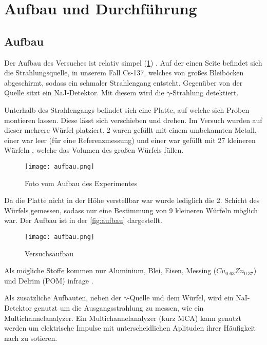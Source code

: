 \section{Aufbau und Durchführung}

\subsection{Aufbau}
Der Aufbau des Versuches ist relativ simpel (\ref{fig:1}) . Auf der einen Seite befindet sich die Strahlungsquelle, in unserem
Fall Cs-137, welches von großes Bleiböcken abgeschirmt, sodass ein schmaler Strahlengang entsteht. Gegenüber 
von der Quelle sitzt ein NaJ-Detektor. Mit diesem wird die $\gamma$-Strahlung detektiert. 

\noindent
Unterhalb des Strahlengangs befindet sich eine Platte, auf welche sich Proben montieren lassen. Diese lässt 
sich verschieben und drehen. Im Versuch wurden auf dieser mehrere Würfel platziert. 2 waren gefüllt mit einem
umbekannten Metall, einer war leer (für eine Referenzmessung) und einer war gefüllt mit 27 kleineren Würfeln
, welche das Volumen des großen Würfels füllen.

\begin{figure}[H]
	\centering
	\texttt{[image: aufbau.png]}
	\caption{Foto vom Aufbau des Experimentes \biber}
	\label{fig:1}
\end{figure}

\noindent
Da die Platte nicht in der Höhe verstellbar war wurde lediglich die 2. Schicht des Würfels gemessen, sodass nur eine Bestimmung von 9 kleineren Würfeln möglich war. Der Aufbau ist
in der \autoref{fig:aufbau} dargestellt.

\begin{figure}
    \centering
    \texttt{[image: aufbau.png]}
    \caption{Versuchsaufbau \cite{V14}}
    \label{fig:aufbau}
  \end{figure}

\noindent
Als mögliche Stoffe kommen nur Aluminium, Blei, Eisen, Messing ($Cu_{0.63}Zn_{0.37}$) und Delrim (POM) infrage \cite{V14}. 

\noindent
Als zusätzliche Aufbauten, neben der $\gamma$-Quelle und dem Würfel, wird ein NaI-Detektor genutzt um die Ausgangsstrahlung zu messen, wie ein Multichannelanalyzer.
Ein Multichannelanalyzer (kurz MCA) kann genutzt werden um elektrische Impulse mit unterscheidlichen Aplituden ihrer Häufigkeit nach zu sotieren. 

